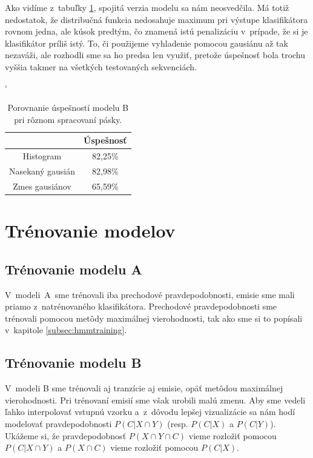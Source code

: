 Ako vidíme z~tabuľky \ref{tab:success-b-tape}, spojitá verzia modelu sa nám neosvedčila. Má totiž nedostatok, že distribučná funkcia nedosahuje maximum pri výstupe klasifikátora rovnom jedna, ale kúsok predtým, čo znamená istú penalizáciu v~prípade, že si je klasifikátor príliš istý. To, či použijeme vyhladenie pomocou gausiánu až tak nezaváži, ale rozhodli sme sa ho predsa len využiť, pretože úspešnosť bola trochu vyššia takmer na všetkých testovaných sekvenciách.


\begin{table}[h]
\catcode`
\centering
\begin{tabular}{cc}
\toprule
& Úspešnosť\\
\midrule
Histogram & 82,25\%\\
Nasekaný gausián & 82,98\%\\
Zmes gausiánov & 65,59\%\\
\bottomrule
\end{tabular}
\vspace{0.5cm}
\caption[Porovnanie úspešností pri rôznom spracovaní pásky]{Porovnanie úspešností modelu B pri rôznom spracovaní pásky.}
\label{tab:success-b-tape}
\end{table}

\section{Trénovanie modelov}
\label{sec:model-training}

\subsection{Trénovanie modelu A}

V~modeli~A~sme trénovali iba prechodové pravdepodobnosti, emisie sme mali priamo z~natrénovaného klasifikátora. Prechodové pravdepodobnosti sme trénovali pomocou metôdy maximálnej vierohodnosti, tak ako sme si to popísali v~kapitole \ref{subsec:hmmtraining}.

\subsection{Trénovanie modelu B}

V~modeli B sme trénovali aj tranzície aj emisie, opäť metôdou maximálnej vierohodnosti. Pri trénovaní emisií sme však urobili malú zmenu. Aby sme vedeli ľahko interpolovať vstupnú vzorku a~z~dôvodu lepšej vizualizácie sa nám hodí modelovať pravdepodobnosti $P(C|X \cap Y)$ (resp. $P(C|X)$ a $P(C|Y)$). Ukážeme si, že pravdepodobnosť $P(X \cap Y \cap C)$ vieme rozložiť pomocou $P(C|X \cap Y)$ a $P(X \cap C)$ vieme rozložiť pomocou $P(C|X)$.

